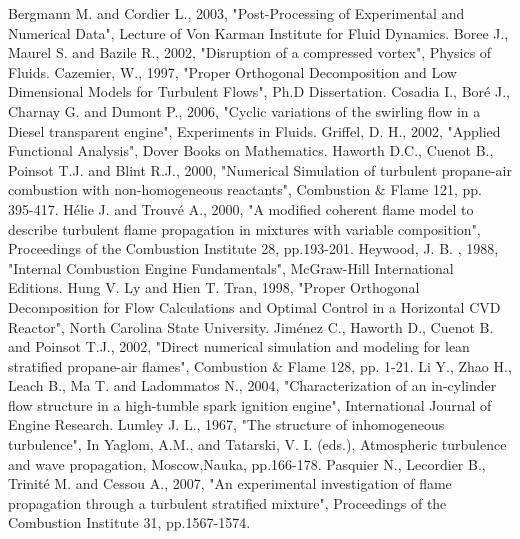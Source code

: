 \documentclass[10pt,fleqn,a4paper]{article}
\begin{document}
\begin{thebibliography}{1}
 Bergmann M. and Cordier L., 2003, "Post-Processing of Experimental and Numerical Data", Lecture of Von Karman Institute for Fluid Dynamics.
 Boree J., Maurel S. and Bazile R., 2002, "Disruption of a compressed vortex", Physics of Fluids.
 Cazemier, W., 1997, "Proper Orthogonal Decomposition and Low Dimensional Models for Turbulent Flows", Ph.D Dissertation.
  Cosadia I., Bor\'{e} J., Charnay G. and Dumont P., 2006, "Cyclic variations of the swirling flow in a Diesel transparent engine", Experiments in Fluids.
 Griffel, D. H., 2002, "Applied Functional Analysis", Dover Books on Mathematics.
 Haworth D.C., Cuenot B., Poinsot T.J. and Blint R.J., 2000, "Numerical Simulation of turbulent propane-air combustion with non-homogeneous reactants", Combustion $\&$ Flame 121, pp. 395-417.
 H\'{e}lie J. and Trouv\'{e} A., 2000, "A modified coherent flame model to describe turbulent flame propagation in mixtures with variable composition", Proceedings of the Combustion Institute 28, pp.193-201.
 Heywood, J. B. , 1988, "Internal Combustion Engine Fundamentals", McGraw-Hill International Editions.
 Hung V. Ly and Hien T. Tran, 1998, "Proper Orthogonal Decomposition for Flow Calculations and Optimal Control in a Horizontal CVD Reactor", North Carolina State University.
 Jim\'{e}nez C., Haworth D., Cuenot B. and Poinsot T.J., 2002, "Direct numerical simulation and modeling for lean stratified propane-air flames", Combustion $\&$ Flame 128, pp. 1-21.
 Li Y., Zhao H., Leach B., Ma T. and Ladommatos N., 2004, "Characterization of an in-cylinder flow structure in a high-tumble spark ignition engine", International Journal  of Engine Research.
 Lumley J. L., 1967, "The structure of inhomogeneous turbulence", In Yaglom, A.M., and Tatarski, V. I. (eds.), Atmospheric turbulence and wave propagation, Moscow,Nauka, pp.166-178.
 Pasquier N., Lecordier B., Trinit\'{e} M. and Cessou A., 2007, "An experimental investigation of flame propagation through a turbulent stratified mixture", Proceedings of the Combustion Institute 31, pp.1567-1574.

\end{thebibliography}
\end{document}
